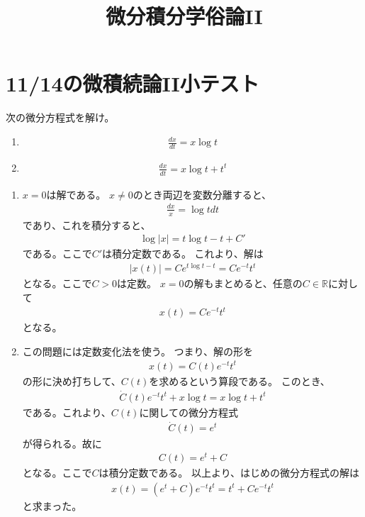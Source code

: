 \documentclass{jsarticle}
\begin{document}
\title{微分積分学俗論II}
\maketitle
\section{11/14の微積続論II小テスト}
\begin{screen}
次の微分方程式を解け。
\begin{enumerate}
\item 
\begin{eqnarray}
\frac{dx}{dt}=x\log t
\end{eqnarray}
\item 
\begin{eqnarray}
\frac{dx}{dt}=x\log t+t^{t}
\end{eqnarray}
\end{enumerate}
\end{screen}
\begin{enumerate}
\item 
$x=0$は解である。
$x\ne 0$のとき両辺を変数分離すると、
\begin{eqnarray}
\frac{dx}{x}=\log tdt
\end{eqnarray}
であり、これを積分すると、
\begin{eqnarray}
\log |x|=t\log t-t+C'
\end{eqnarray}
である。ここで$C'$は積分定数である。
これより、解は
\begin{eqnarray}
|x(t)|=Ce^{t\log t-t}=Ce^{-t}t^{t}
\end{eqnarray}
となる。ここで$C>0$は定数。
$x=0$の解もまとめると、任意の$C\in\mathbb{R}$に対して
\begin{eqnarray}
x(t)=Ce^{-t}t^{t}
\end{eqnarray}
となる。
\item
この問題には定数変化法を使う。
つまり、解の形を
\begin{eqnarray}
x(t)=C(t)e^{-t}t^{t}
\end{eqnarray}
の形に決め打ちして、$C(t)$を求めるという算段である。
このとき、
\begin{eqnarray}
\dot{C}(t)e^{-t}t^{t}+x\log t=x\log t+t^{t}
\end{eqnarray}
である。これより、$C(t)$に関しての微分方程式
\begin{eqnarray}
\dot{C}(t)=e^{t}
\end{eqnarray}
が得られる。故に
\begin{eqnarray}
C(t)=e^{t}+C
\end{eqnarray}
となる。ここで$C$は積分定数である。
以上より、はじめの微分方程式の解は
\begin{eqnarray}
x(t)=(e^{t}+C)e^{-t}t^{t}=t^{t}+Ce^{-t}t^{t}
\end{eqnarray}
と求まった。
\end{enumerate}
\end{document}
